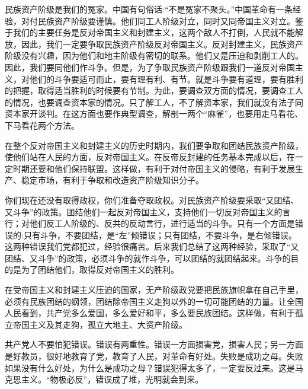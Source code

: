 民族资产阶级是我们的冤家。中国有句俗话:“不是冤家不聚头。”中国革命有一条经验，对付民族资产阶级要谨慎。他们同工人阶级对立，同时又同帝国主义对立。鉴于我们的主要任务是反对帝国主义和封建主义，这两个敌人不打倒，人民就不能解放，因此，我们一定要争取民族资产阶级反对帝国主义。反对封建主义，民族资产阶级没有兴趣，因为他们和地主阶级有密切的联系。他们又是压迫和剥削工人的。因此，我们要同他们作斗争。但是，为了争取民族资产阶级跟我们一道反对帝国主义，对他们的斗争要适可而止，要有理有利、有节。就是斗争要有道理，要有胜利的把握，取得适当胜利的时候要有节制。为此，要调查双方面的情况，要调查工人的情况，也要调查资本家的情况。只了解工人，不了解资本家，我们就没有法子同资本家开谈判。在这方面也要作典型调查，解剖一两个“麻雀”，也要用走马看花、下马看花两个方法。

在整个反对帝国主义和封建主义的历史时期内，我们要争取和团结民族资产阶级，使他们站在人民的方面，反对帝国主义。在反帝反封建的任务基本完成以后，在一定时期还要和他们保持联盟。这样做，有利于对付帝国主义的侵略，有利于发展生产、稳定市场，有利于争取和改造资产阶级知识分子。

你们现在还没有取得政权，你们准备夺取政权。对民族资产阶级要采取“又团结、又斗争”的政策。团结他们一起反对帝国主义，支持他们一切反对帝国主义的言行；对他们反工人阶级的、反共的反动言行，进行适当的斗争。只有一个方面是错误的:只有斗争，不要团结，是“左”倾错误；只有团结，不要斗争，是右倾错误。这两种错误我们党都犯过，经验很痛苦。后来我们总结了这两种经验，采取了“又团结、又斗争”的政策，必须斗争的就作斗争，可以团结的就团结起来。斗争的目的是为了团结他们，取得反对帝国主义的胜利。

在受帝国主义和封建主义压迫的国家，无产阶级政党要把民族旗帜拿在自己手里，必须有民族团结的纲领，团结除帝国主义走狗以外的一切可能团结的力量。让全国人民看到，共产党多么爱国，多么爱好和平，多么要民族团结。这样做，有利于孤立帝国主义及其走狗，孤立大地主、大资产阶级。

共产党人不要怕犯错误。错误有两重性。错误一方面损害党，损害人民；另一方面是好教员，很好地教育了党，教育了人民，对革命有好处。失败是成功之母。失败如果没有什么好处，为什么是成功之母？错误犯得太多了，一定要反过来。这是马克思主义。“物极必反”，错误成了堆，光明就会到来。
